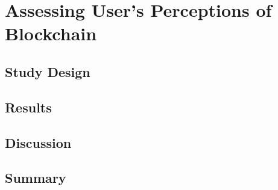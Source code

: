 
\chapter{Assessing User's Perceptions of Blockchain}

\section{Study Design}

\section{Results}

\section{Discussion}

\section{Summary}